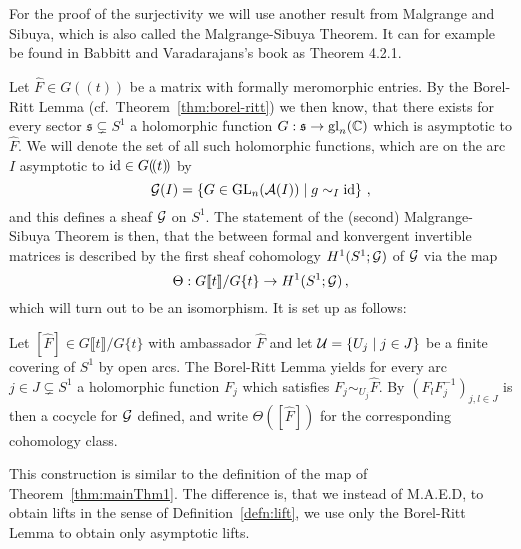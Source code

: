 For the proof of the surjectivity we will use another result from Malgrange and
Sibuya, which is also called the Malgrange-Sibuya Theorem. It can for example
be found in Babbitt and Varadarajans's book \cite[65ff]{babbitt1989local} as
Theorem 4.2.1.

Let $\hat F\in G(\!(t)\!)$ be a matrix with formally meromorphic entries. By
the Borel-Ritt Lemma (cf.\ Theorem~\ref{thm:borel-ritt}) we then know, that
there exists for every sector $\mathfrak{s}\subsetneq S^1$ a holomorphic
function $G:\mathfrak{s}\to\operatorname{gl}_n(\mathbb{C})$ which is asymptotic to $\hat F$.
We will denote the set of all such holomorphic functions, which are on
the arc $I$ asymptotic to $\operatorname{id}\in G(\!(t)\!)$ by
\[
  \mathcal{G}(I)=\left\{G\in\operatorname{GL}_n(\mathcal{A}(I))\mid g\sim_I\operatorname{id}\right\}\,,
\]
and this defines a sheaf $\mathcal{G}$ on $S^1$.
The statement of the (second) Malgrange-Sibuya Theorem is then, that the
 between formal and konvergent invertible matrices is
described by the first sheaf cohomology $H^1(S^1;\mathcal{G})$ of $\mathcal{G}$ via the map
\[
  \Theta: G\llbracket t\rrbracket/G\{t\}\to H^1(S^1;\mathcal{G}) \,,
\]
which will turn out to be an isomorphism. It is set up as follows:
\begin{einr}
  Let $[\hat F]\in G\llbracket t\rrbracket/G\{t\}$ with ambassador $\hat F$ and
  let $\mathcal{U}=\{U_j\mid j\in J\}$ be a finite covering of $S^1$ by open arcs.
  The Borel-Ritt Lemma yields for every arc $j\in J\subsetneq S^1$ a
  holomorphic function $F_j$ which satisfies $F_j\sim_{U_j}\hat F$.
  By $(F_lF_j^{-1})_{j,l\in J}$ is then a cocycle for $\mathcal{G}$ defined,
  and write $\Theta([\hat F])$ for the corresponding cohomology class.
\end{einr}
This construction is similar to the definition of the map of
Theorem~\ref{thm:mainThm1}. The difference is, that we instead of M.A.E.D, to
obtain lifts in the sense of Definition~\ref{defn:lift}, we use only the
Borel-Ritt Lemma to obtain only asymptotic lifts.

